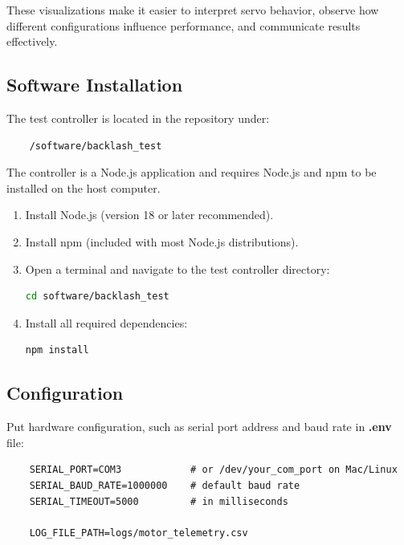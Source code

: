 \documentclass[11pt,letterpaper]{article}
\begin{document}
These visualizations make it easier to interpret servo behavior, observe how different configurations influence performance, and communicate results effectively.

\subsection{Software Installation}
\label{subsec:software-install}

The test controller is located in the repository under:

\begin{verbatim}
    /software/backlash_test
\end{verbatim}

The controller is a Node.js application and requires Node.js and npm to be installed on the host computer.

\begin{enumerate}
    \item Install Node.js (version 18 or later recommended).
    \item Install npm (included with most Node.js distributions).
    \item Open a terminal and navigate to the test controller directory:
    
    \begin{lstlisting}[language=bash]
    cd software/backlash_test
    \end{lstlisting}

    \item Install all required dependencies:
    
    \begin{lstlisting}[language=bash]
    npm install
    \end{lstlisting}
\end{enumerate}

\subsection{Configuration}
\label{subsec:configuration}

Put hardware configuration, such as serial port address and baud rate in \textbf{.env} file:

\begin{verbatim}
    SERIAL_PORT=COM3            # or /dev/your_com_port on Mac/Linux
    SERIAL_BAUD_RATE=1000000    # default baud rate
    SERIAL_TIMEOUT=5000         # in milliseconds

    LOG_FILE_PATH=logs/motor_telemetry.csv
\end{verbatim}
\end{document}
